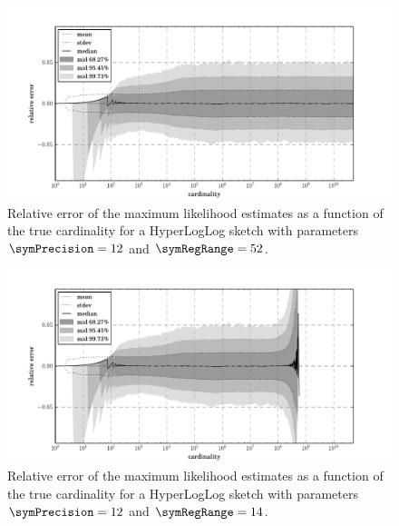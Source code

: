 \documentclass[a4paper]{scrartcl}
\begin{document}
\begin{figure}
\centering
\includegraphics[width=1\textwidth]{max_likelihood_estimate_12_52}
\caption{Relative error of the maximum likelihood estimates as a function of the true cardinality for a HyperLogLog sketch with parameters $\symPrecision = 12$ and $\symRegRange=52$.}
\label{fig:max_likelihood_estimation_error_12_52}
\end{figure}

\begin{figure}
\centering
\includegraphics[width=1\textwidth]{max_likelihood_estimate_12_14}
\caption{Relative error of the maximum likelihood estimates as a function of the true cardinality for a HyperLogLog sketch with parameters $\symPrecision = 12$ and $\symRegRange=14$.}
\label{fig:max_likelihood_estimation_error_12_14}
\end{figure}
\end{document}
